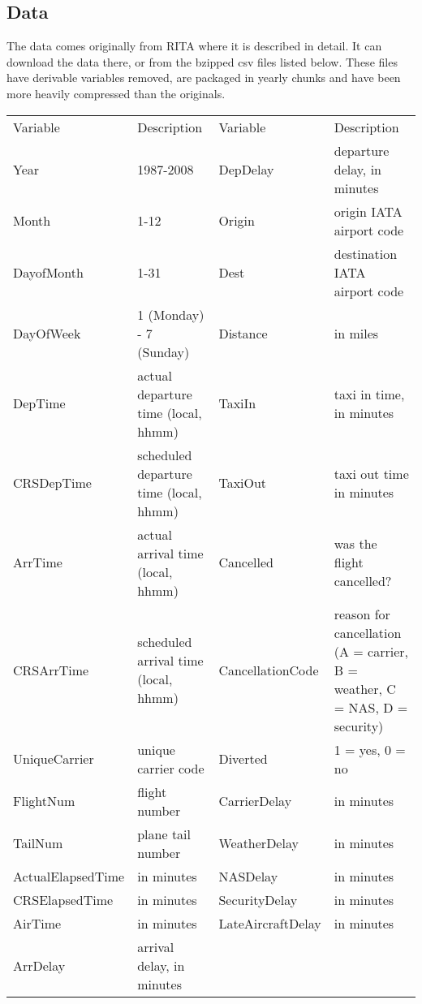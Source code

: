 \subsection{Data}
The data comes originally from RITA where it is described in detail. It can download the data there, or from the bzipped csv files listed below. These files have derivable variables removed, are packaged in yearly chunks and have been more heavily compressed than the originals.

\begin{tabular}{llll}
	Variable & Description & Variable & Description\\
	Year & 1987-2008 & DepDelay & departure delay, in minutes\\
	Month & 1-12 & Origin & 	origin IATA airport code\\
	DayofMonth & 1-31 & Dest & 	destination IATA airport code\\
	DayOfWeek & 1 (Monday) - 7 (Sunday) & Distance & in miles\\
	DepTime & actual departure time (local, hhmm) & TaxiIn & taxi in time, in minutes\\
	CRSDepTime & scheduled departure time (local, hhmm) & TaxiOut & taxi out time in minutes\\
	ArrTime & actual arrival time (local, hhmm) & Cancelled & was the flight cancelled?\\
	CRSArrTime  & scheduled arrival time (local, hhmm) & CancellationCode & 	reason for cancellation (A = carrier, B = weather, C = NAS, D = security)\\
	UniqueCarrier & 	unique carrier code & Diverted & 1 = yes, 0 = no\\
	FlightNum & flight number & CarrierDelay & in minutes\\
	TailNum & plane tail number & WeatherDelay & in minutes\\
	ActualElapsedTime  & in minutes & NASDelay & in minutes\\
	CRSElapsedTime &  	in minutes & SecurityDelay & in minutes\\
	AirTime & in minutes & LateAircraftDelay & in minutes\\
	ArrDelay & arrival delay, in minutes &  & \\
\end{tabular}






